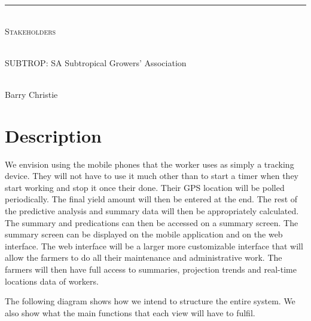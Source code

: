 \documentclass[12pt]{article}
\begin{document}
\begin{titlepage}
\begin{center}
		\rule{\linewidth}{0.5mm} \\[1cm] 
		\textsc{\Large Stakeholders}\\[1cm]	
		
		\begin{minipage}{0.4\textwidth}
			\begin{flushleft} \large
				\emph{} \\
				SUBTROP: SA Subtropical Growers' Association
			\end{flushleft}
		\end{minipage}
		\begin{minipage}{0.4\textwidth}
			\begin{flushright} \large
				\emph{} \\
				Barry Christie
			\end{flushright}
		\end{minipage}

		
	\end{center}
\end{titlepage}
	
    \newpage
	\tableofcontents
	\newpage
	
	\section{Description}
	We envision using the mobile phones that the worker uses as simply a tracking device. They will not have to use it much other than to start a timer when they start working and stop it once their done. Their GPS location will be polled periodically. The final yield amount will then be entered at the end. The rest of the predictive analysis and summary data will then be appropriately calculated. The summary and predications can then be accessed on a summary screen. The summary screen can be displayed on the mobile application and on the web interface. The web interface will be a larger more customizable interface that will allow the farmers to do all their maintenance and administrative work. The farmers will then have full access to summaries, projection trends and real-time locations data of workers.
	
	The following diagram shows how we intend to structure the entire system. We also show what the main functions that each view will have to fulfil.
	
\end{document}
